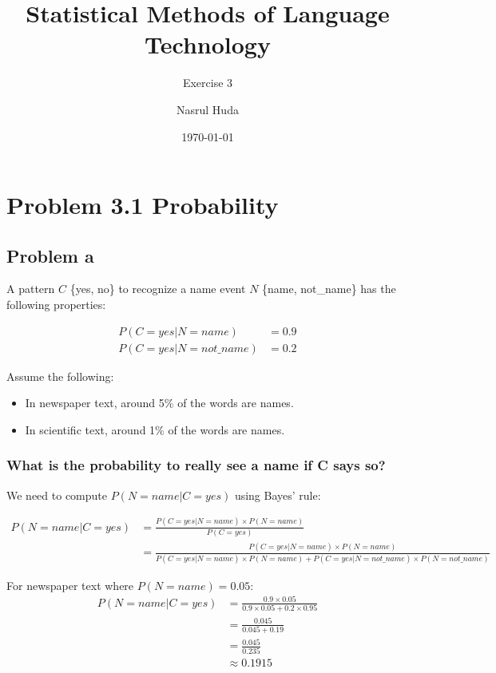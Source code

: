 \documentclass[a4paper,margin=1cm]{article}
\title{Statistical Methods of Language Technology}
\subtitle{Exercise 3}
\author{Nasrul Huda}
\date{\today}
\begin{document}
\maketitle

\section{Problem 3.1 Probability}

\subsection{Problem a}
A pattern $C$ \{yes, no\} to recognize a name event $N$ \{name, not\_name\} has the following properties:

\begin{align*}
P(C = yes|N = name) &= 0.9\\
P(C = yes|N = not\_name) &= 0.2
\end{align*}

Assume the following:
\begin{itemize}
    \item In newspaper text, around 5\% of the words are names.
    \item In scientific text, around 1\% of the words are names.
\end{itemize}

\subsubsection{What is the probability to really see a name if C says so?}
We need to compute $P(N = name|C = yes)$ using Bayes' rule:

\begin{align*}
P(N = name|C = yes) &= \frac{P(C = yes|N = name) \times P(N = name)}{P(C = yes)}\\
&= \frac{P(C = yes|N = name) \times P(N = name)}{P(C = yes|N = name) \times P(N = name) + P(C = yes|N = not\_name) \times P(N = not\_name)}
\end{align*}

For newspaper text where $P(N = name) = 0.05$:
\begin{align*}
P(N = name|C = yes) &= \frac{0.9 \times 0.05}{0.9 \times 0.05 + 0.2 \times 0.95}\\
&= \frac{0.045}{0.045 + 0.19}\\
&= \frac{0.045}{0.235}\\
&\approx 0.1915
\end{align*}
\end{document}
